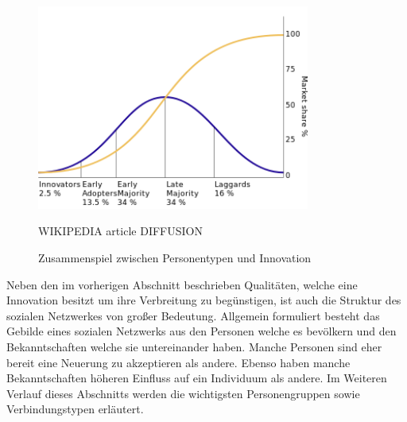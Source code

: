 \documentclass[12pt]{article}
\begin{document}
\begin{figure}
  \begin{center}
    \includegraphics[width=0.80\textwidth]{pic_diffusion.png}
  \end{center}
  \caption{Zusammenspiel zwischen Personentypen und Innovation}
  WIKIPEDIA article DIFFUSION
  \label{pic_diffusion}
\end{figure}

Neben den im vorherigen Abschnitt beschrieben Qualitäten, welche eine Innovation besitzt um ihre Verbreitung zu begünstigen, ist auch die Struktur des sozialen Netzwerkes von großer Bedeutung. Allgemein formuliert besteht das Gebilde eines sozialen Netzwerks aus den Personen welche es bevölkern und den Bekanntschaften welche sie untereinander haben. Manche Personen sind eher bereit eine Neuerung zu akzeptieren als andere. Ebenso haben manche Bekanntschaften höheren Einfluss auf ein Individuum als andere. Im Weiteren Verlauf dieses Abschnitts werden die wichtigsten Personengruppen sowie Verbindungstypen erläutert.
\end{document}
